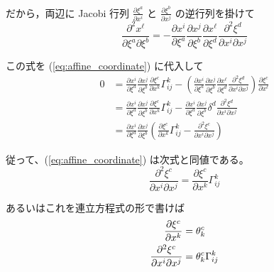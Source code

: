 \documentclass[a4paper,11pt]{jsarticle}
\numberwithin{equation}{section}
\begin{document}
    だから，両辺に Jacobi 行列 $\frac{\partial \xi^a}{\partial x^i}$ と $\frac{\partial \xi^b}{\partial x^j}$ の逆行列を掛けて
    \begin{equation}
    \frac{\partial^2 x^\ell}{\partial \xi^a \partial \xi^b} = -\frac{\partial x^i}{\partial \xi^a} \frac{\partial x^j}{\partial \xi^b} \frac{\partial x^\ell}{\partial \xi^d} \frac{\partial^2 \xi^d}{\partial x^i \partial x^j}
    \end{equation}
    
    この式を (\ref{eq:affine_coordinate}) に代入して
    \begin{align}
    0 &= \frac{\partial x^i}{\partial \xi^a} \frac{\partial x^j}{\partial \xi^b} \frac{\partial \xi^c}{\partial x^k} \Gamma^k_{ij} - \left( \frac{\partial x^i}{\partial \xi^a} \frac{\partial x^j}{\partial \xi^b} \frac{\partial x^\ell}{\partial \xi^d} \frac{\partial^2 \xi^d}{\partial x^i \partial x^j} \right) \frac{\partial \xi^c}{\partial x^\ell} \\
    &= \frac{\partial x^i}{\partial \xi^a} \frac{\partial x^j}{\partial \xi^b} \frac{\partial \xi^c}{\partial x^k} \Gamma^k_{ij} - \frac{\partial x^i}{\partial \xi^a} \frac{\partial x^j}{\partial \xi^b} \delta^d \frac{\partial^2 \xi^d}{\partial x^i \partial x^j} \\
    &= \frac{\partial x^i}{\partial \xi^a} \frac{\partial x^j}{\partial \xi^b} \left( \frac{\partial \xi^c}{\partial x^k} \Gamma^k_{ij} - \frac{\partial^2 \xi^c}{\partial x^i \partial x^j} \right)
    \end{align}
    
    従って、(\ref{eq:affine_coordinate}) は次式と同値である。
    \begin{equation}
    \frac{\partial^2 \xi^c}{\partial x^i \partial x^j} = \frac{\partial \xi^c}{\partial x^k} \Gamma^k_{ij}
    \end{equation}
    
    あるいはこれを連立方程式の形で書けば
    \begin{align}
        \frac{\partial \xi^c}{\partial x^k} &= \theta^c_k \\
        \pdv{\xi^c}{x^i}{x^j} &= \theta^c_k \Gamma^k_{ij}
    \end{align}
\end{document}
